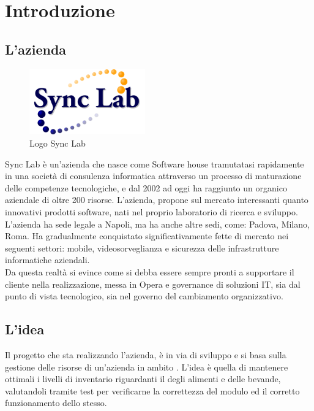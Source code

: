 
\chapter{Introduzione}
\section{L'azienda}
\begin{figure}[H]
	\begin{center} \includegraphics[width=5cm]{figures/logo_synclab}
		\caption[Logo Sync Lab]{Logo Sync Lab} 
		\label{logo_python} 
	\end{center}
\end{figure}
Sync Lab è un'azienda che nasce come Software house tramutatasi rapidamente in una società di consulenza informatica attraverso un processo di maturazione delle competenze tecnologiche, e dal 2002 ad oggi ha raggiunto un organico aziendale di oltre 200 risorse.
L'azienda, propone sul mercato interessanti quanto innovativi prodotti software, nati nel proprio laboratorio di ricerca e sviluppo.\\
L'azienda ha sede legale a Napoli, ma ha anche altre sedi, come: Padova, Milano, Roma. 
Ha gradualmente conquistato significativamente fette di mercato nei seguenti settori: mobile, videosorveglianza e sicurezza delle infrastrutture informatiche aziendali.\\
Da questa realtà si evince come si debba essere sempre pronti a supportare il cliente nella realizzazione, messa in Opera e governance di soluzioni IT, sia dal punto di vista tecnologico, sia nel governo del cambiamento organizzativo.

\section{L'idea}
Il progetto che sta realizzando l'azienda, è in via di sviluppo e si basa sulla gestione delle risorse di un'azienda in ambito .
L'idea è quella di mantenere ottimali i livelli di inventario riguardanti il  degli alimenti e delle bevande, valutandoli tramite test per verificarne la correttezza del modulo ed il corretto funzionamento dello stesso.

